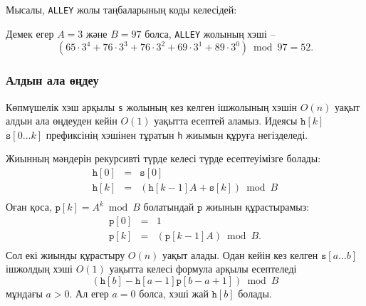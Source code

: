 Мысалы, \texttt{ALLEY} жолы таңбаларының коды
келесідей:
\begin{center}
\end{center}

Демек егер $A=3$ және $B=97$ болса, \texttt{ALLEY} 
жолының хэші --
\[(65 \cdot 3^4 + 76 \cdot 3^3 + 76 \cdot 3^2 + 69 \cdot 3^1 + 89 \cdot 3^0) \bmod 97 = 52.\]


\subsubsection*{Алдын ала өңдеу}

Көпмүшелік хэш арқылы \texttt{s} жолының кез келген ішжолының хэшін
$O(n)$ уақыт алдын ала өңдеуден кейін $O(1)$ уақытта есептей аламыз. 
Идеясы $\texttt{h}[k]$ $\texttt{s}[0 \ldots k]$ префиксінің хэшінен тұратын \texttt{h} жиымын құруға негізделеді. 

Жиынның мәндерін рекурсивті түрде келесі түрде есептеуімізге болады:
\[
\begin{array}{lcl}
\texttt{h}[0] & = & \texttt{s}[0] \\
\texttt{h}[k] & = & (\texttt{h}[k-1] A + \texttt{s}[k]) \bmod B \\
\end{array}
\]
Оған қоса, $\texttt{p}[k]=A^k \bmod B$ болатындай $\texttt{p}$ 
жиынын құрастырамыз:
\[
\begin{array}{lcl}
\texttt{p}[0] & = & 1 \\
\texttt{p}[k] & = & (\texttt{p}[k-1] A) \bmod B. \\
\end{array}
\]
Сол екі жиынды құрастыру $O(n)$ уақыт алады. 
Одан кейін кез келген $\texttt{s}[a \ldots b]$ ішжолдың
хэші $O(1)$ уақытта келесі формула арқылы есептеледі 
\[(\texttt{h}[b]-\texttt{h}[a-1] \texttt{p}[b-a+1]) \bmod B\]
мұндағы $a>0$. Ал егер $a=0$ болса, хэші жай $\texttt{h}[b]$ болады. 

